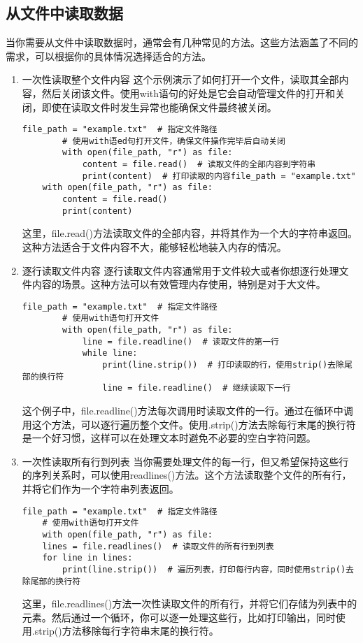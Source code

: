\documentclass{article}
\begin{document}
\subsection{从文件中读取数据}
当你需要从文件中读取数据时，通常会有几种常见的方法。这些方法涵盖了不同的需求，可以根据你的具体情况选择适合的方法。
\begin{enumerate}
    \item 一次性读取整个文件内容
    这个示例演示了如何打开一个文件，读取其全部内容，然后关闭该文件。使用with语句的好处是它会自动管理文件的打开和关闭，即使在读取文件时发生异常也能确保文件最终被关闭。
    \begin{lstlisting}[caption={示例Python代码}]
        file_path = "example.txt"  # 指定文件路径
        # 使用with语ed句打开文件，确保文件操作完毕后自动关闭
        with open(file_path, "r") as file:
            content = file.read()  # 读取文件的全部内容到字符串
            print(content)  # 打印读取的内容file_path = "example.txt"
    with open(file_path, "r") as file:
        content = file.read()
        print(content)
    \end{lstlisting}
    这里，file.read()方法读取文件的全部内容，并将其作为一个大的字符串返回。这种方法适合于文件内容不大，能够轻松地装入内存的情况。
    \item 逐行读取文件内容
    逐行读取文件内容通常用于文件较大或者你想逐行处理文件内容的场景。这种方法可以有效管理内存使用，特别是对于大文件。
    \begin{lstlisting}[caption={示例Python代码}]
        file_path = "example.txt"  # 指定文件路径
        # 使用with语句打开文件
        with open(file_path, "r") as file:
            line = file.readline()  # 读取文件的第一行
            while line:
                print(line.strip())  # 打印读取的行，使用strip()去除尾部的换行符
                line = file.readline()  # 继续读取下一行
    \end{lstlisting}        
    这个例子中，file.readline()方法每次调用时读取文件的一行。通过在循环中调用这个方法，可以逐行遍历整个文件。使用.strip()方法去除每行末尾的换行符是一个好习惯，这样可以在处理文本时避免不必要的空白字符问题。 
    \item 一次性读取所有行到列表
    当你需要处理文件的每一行，但又希望保持这些行的序列关系时，可以使用readlines()方法。这个方法读取整个文件的所有行，并将它们作为一个字符串列表返回。
    \begin{lstlisting}[caption={示例Python代码}]
    file_path = "example.txt"  # 指定文件路径
    # 使用with语句打开文件
    with open(file_path, "r") as file:
    lines = file.readlines()  # 读取文件的所有行到列表
    for line in lines:
        print(line.strip())  # 遍历列表，打印每行内容，同时使用strip()去除尾部的换行符
    \end{lstlisting}
    这里，file.readlines()方法一次性读取文件的所有行，并将它们存储为列表中的元素。然后通过一个循环，你可以逐一处理这些行，比如打印输出，同时使用.strip()方法移除每行字符串末尾的换行符。 
\end{enumerate}
\end{document}
